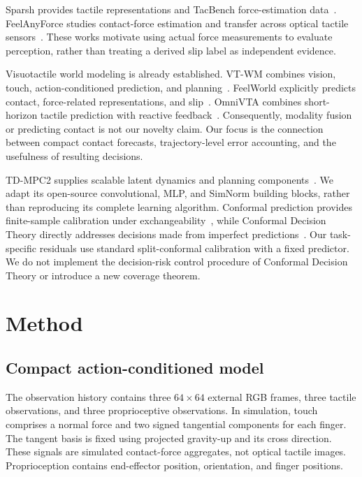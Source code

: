 \documentclass[letterpaper,10pt,conference]{ieeeconf}
\begin{document}
Sparsh provides tactile representations and TacBench force-estimation
data~\cite{sparsh}. FeelAnyForce studies contact-force estimation and transfer
across optical tactile sensors~\cite{feelanyforce}. These works motivate using
actual force measurements to evaluate perception, rather than treating a
derived slip label as independent evidence.

Visuotactile world modeling is already established. VT-WM combines vision,
touch, action-conditioned prediction, and planning~\cite{vtwm}. FeelWorld
explicitly predicts contact, force-related representations, and
slip~\cite{feelworld}. OmniVTA combines short-horizon tactile prediction with
reactive feedback~\cite{omnivta}. Consequently, modality fusion or predicting
contact is not our novelty claim. Our focus is the connection between compact
contact forecasts, trajectory-level error accounting, and the usefulness of
resulting decisions.

TD-MPC2 supplies scalable latent dynamics and planning components~\cite{tdmpc2}.
We adapt its open-source convolutional, MLP, and SimNorm building blocks, rather
than reproducing its complete learning algorithm. Conformal prediction provides
finite-sample calibration under exchangeability~\cite{conformal}, while
Conformal Decision Theory directly addresses decisions made from imperfect
predictions~\cite{cdt}. Our task-specific residuals use standard split-conformal calibration with a
fixed predictor. We do not implement the decision-risk control
procedure of Conformal Decision Theory or introduce a new coverage theorem.

\section{Method}

\subsection{Compact action-conditioned model}

The observation history contains three $64\times64$ external RGB frames, three
tactile observations, and three proprioceptive observations. In simulation,
touch comprises a normal force and two signed tangential components for each
finger. The tangent basis is fixed using projected gravity-up and its cross
direction. These signals are simulated contact-force aggregates, not optical
tactile images. Proprioception contains end-effector position, orientation, and
finger positions.
\end{document}

